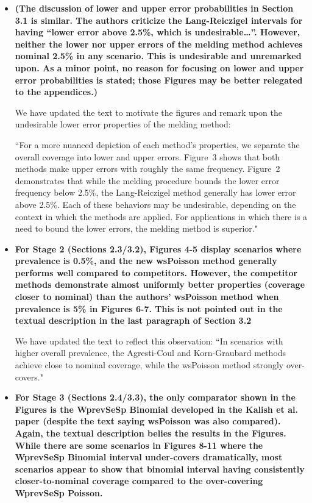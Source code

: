 \documentclass[11pt]{article}
\begin{document}
\begin{itemize}
    \item \textbf{(The discussion of lower and upper error probabilities in Section 3.1 is similar. The authors criticize the Lang-Reiczigel intervals for having “lower error above 2.5\%, which is undesirable…”. However, neither the lower nor upper errors of the melding method achieves nominal 2.5\% in any scenario. This is undesirable and unremarked upon. As a minor point, no reason for focusing on lower and upper error probabilities is stated; those Figures may be better relegated to the appendices.)}
    
    We have updated the text to motivate the figures and remark upon the undesirable lower error properties of the melding method:
    
    ``For a more nuanced depiction of each method's properties, we separate the overall coverage into lower and upper errors.
    Figure~3 shows that both methods make upper errors with roughly the same frequency.
    Figure~2 demonstrates that while the melding procedure bounds the lower error frequency below 2.5\%, the Lang-Reiczigel method generally has lower error above 2.5\%.
    Each of these behaviors may be undesirable, depending on the context in which the methods are applied.
    For applications in which there is a need to bound the lower errors, the melding method is superior."

    \item \textbf{For Stage 2 (Sections 2.3/3.2), Figures 4-5 display scenarios where prevalence is 0.5\%, and the new wsPoisson method generally performs well compared to competitors. However, the competitor methods demonstrate almost uniformly better properties (coverage closer to nominal) than the authors’ wsPoisson method when prevalence is 5\% in Figures 6-7. This is not pointed out in the textual description in the last paragraph of Section 3.2}

    We have updated the text to reflect this observation:
    ``In scenarios with higher overall prevalence, the Agresti-Coul and Korn-Graubard methods achieve close to nominal coverage, while the wsPoisson method strongly over-covers."

    \item \textbf{For Stage 3 (Sections 2.4/3.3), the only comparator shown in the Figures is the WprevSeSp Binomial developed in the Kalish et al. paper (despite the text saying wsPoisson was also compared). Again, the textual description belies the results in the Figures. While there are some scenarios in Figures 8-11 where the WprevSeSp Binomial interval under-covers dramatically, most scenarios appear to show that binomial interval having consistently closer-to-nominal coverage compared to the over-covering WprevSeSp Poisson.}
    

\end{itemize}
\end{document}
